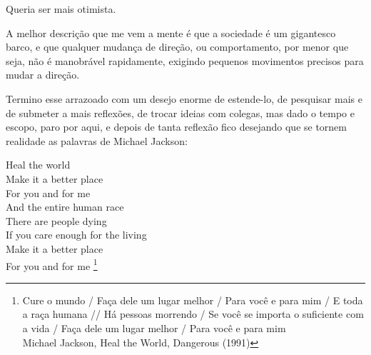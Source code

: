 Queria ser mais otimista.

A melhor descrição que me vem a mente é que a sociedade é um gigantesco barco, e que qualquer mudança de direção, ou comportamento, por menor que seja, não é manobrável rapidamente, exigindo pequenos movimentos precisos para mudar a direção.

Termino esse arrazoado com um desejo enorme de estende-lo, de pesquisar mais e de submeter a mais reflexões, de trocar ideias com colegas, mas dado o tempo e escopo, paro por aqui, e depois de tanta reflexão fico desejando que se tornem realidade as palavras de Michael Jackson:

\begin{citacao}
    Heal the world\\
    Make it a better place\\
    For you and for me\\
    And the entire human race\\

    There are people dying\\
    If you care enough for the living\\
    Make it a better place\\
    For you and for me \footnote{
        Cure o mundo / Faça dele um lugar melhor / Para você e para mim / E toda a raça humana //
        Há pessoas morrendo / Se você se importa o suficiente com a vida / Faça dele um lugar melhor / Para você e para mim \\
        Michael Jackson, Heal the World, Dangerous (1991)
    }
\end{citacao}
